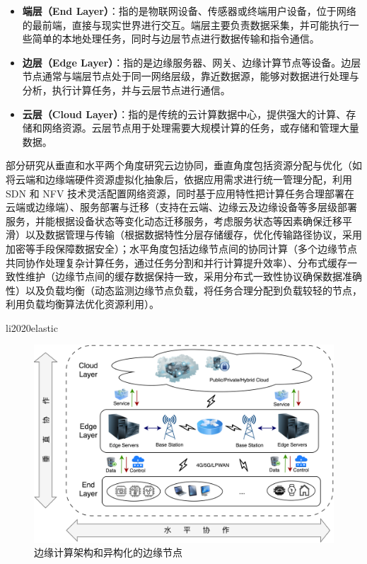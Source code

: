 \begin{itemize} 
\item \textbf{端层（End Layer）}：指的是物联网设备、传感器或终端用户设备，位于网络的最前端，直接与现实世界进行交互。端层主要负责数据采集，并可能执行一些简单的本地处理任务，同时与边层节点进行数据传输和指令通信。
\item \textbf{边层（Edge Layer）}：指的是边缘服务器、网关、边缘计算节点等设备。边层节点通常与端层节点处于同一网络层级，靠近数据源，能够对数据进行处理与分析，执行计算任务，并与云层节点进行通信。
\item \textbf{云层（Cloud Layer）}：指的是传统的云计算数据中心，提供强大的计算、存储和网络资源。云层节点用于处理需要大规模计算的任务，或存储和管理大量数据。
\end{itemize}




部分研究\cite{dupont2017edge,li2020elastic,shan2024kces}从垂直和水平两个角度研究云边协同，垂直角度包括资源分配与优化（如将云端和边缘端硬件资源虚拟化抽象后，依据应用需求进行统一管理分配，利用 SDN 和 NFV 技术灵活配置网络资源，同时基于应用特性把计算任务合理部署在云端或边缘端）、服务部署与迁移（支持在云端、边缘云及边缘设备等多层级部署服务，并能根据设备状态等变化动态迁移服务，考虑服务状态等因素确保迁移平滑）以及数据管理与传输（根据数据特性分层存储缓存，优化传输路径协议，采用加密等手段保障数据安全）；水平角度包括边缘节点间的协同计算（多个边缘节点共同协作处理复杂计算任务，通过任务分割和并行计算提升效率）、分布式缓存一致性维护（边缘节点间的缓存数据保持一致，采用分布式一致性协议确保数据准确性）以及负载均衡（动态监测边缘节点负载，将任务合理分配到负载较轻的节点，利用负载均衡算法优化资源利用）。


li2020elastic



\begin{figure}[ht]
  \centering
  \includegraphics[width=\linewidth]{pics/2-1云边端架构.png}
  \caption{边缘计算架构和异构化的边缘节点}
  \label{fig:my_label}
\end{figure}




